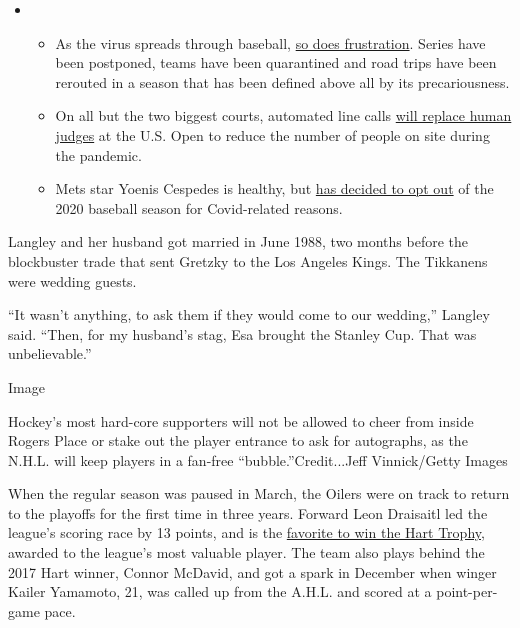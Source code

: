 \begin{itemize}
\item
  \begin{itemize}
  \tightlist
  \item
    As the virus spreads through baseball,
    \href{https://www.nytimes3xbfgragh.onion/2020/08/03/sports/baseball/mlb-coronavirus-outbreak.html?action=click\&pgtype=Article\&state=default\&region=MAIN_CONTENT_2\&context=storylines_keepup}{so
    does frustration}. Series have been postponed, teams have been
    quarantined and road trips have been rerouted in a season that has
    been defined above all by its precariousness.
  \item
    On all but the two biggest courts, automated line calls
    \href{https://www.nytimes3xbfgragh.onion/2020/08/03/sports/tennis/us-open-hawkeye-line-judges.html?action=click\&pgtype=Article\&state=default\&region=MAIN_CONTENT_2\&context=storylines_keepup}{will
    replace human judges} at the U.S. Open to reduce the number of
    people on site during the pandemic.
  \item
    Mets star Yoenis Cespedes is healthy, but
    \href{https://www.nytimes3xbfgragh.onion/2020/08/02/sports/baseball/Yoenis-cespedes-opt-out-rule.html?action=click\&pgtype=Article\&state=default\&region=MAIN_CONTENT_2\&context=storylines_keepup}{has
    decided to opt out} of the 2020 baseball season for Covid-related
    reasons.
  \end{itemize}
\end{itemize}

Langley and her husband got married in June 1988, two months before the
blockbuster trade that sent Gretzky to the Los Angeles Kings. The
Tikkanens were wedding guests.

``It wasn't anything, to ask them if they would come to our wedding,''
Langley said. ``Then, for my husband's stag, Esa brought the Stanley
Cup. That was unbelievable.''

Image

Hockey's most hard-core supporters will not be allowed to cheer from
inside Rogers Place or stake out the player entrance to ask for
autographs, as the N.H.L. will keep players in a fan-free
``bubble.''Credit...Jeff Vinnick/Getty Images

When the regular season was paused in March, the Oilers were on track to
return to the playoffs for the first time in three years. Forward Leon
Draisaitl led the league's scoring race by 13 points, and is the
\href{https://www.nytimes3xbfgragh.onion/2020/07/27/sports/hockey/nhl-awards-restart-postseason.html}{favorite
to win the Hart Trophy,} awarded to the league's most valuable player.
The team also plays behind the 2017 Hart winner, Connor McDavid, and got
a spark in December when winger Kailer Yamamoto, 21, was called up from
the A.H.L. and scored at a point-per-game pace.

